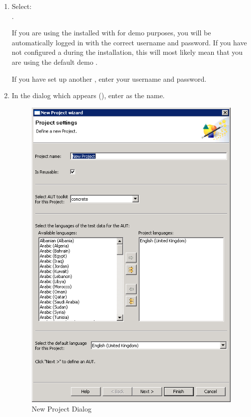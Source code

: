 \begin{enumerate}
\item Select:\\ . 

If you are using the \gddb{} installed with \gd{} for demo purposes, you will be automatically logged in with the correct username and password. If you have not configured a \gddb{} during the installation, this will most likely mean that you are using the default demo \gddb{}. 

If you have set up another \gddb{}, enter your username and password.  

\item In the  dialog which appears (), enter 
 as the  \gdproject{} name. 

\begin{figure}[h]
\begin{center}
\includegraphics[width=12cm]{Tutorials/PS/TutNewProject}
\caption{New Project Dialog}
\label{TutNewProject}
\end{center}
\end{figure}



\end{enumerate}
